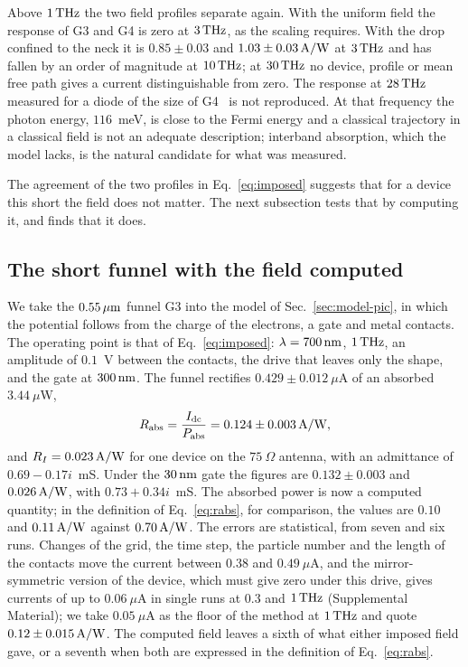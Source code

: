 Above $1\,\mathrm{THz}$ the two field profiles separate again. With the uniform field
the response of G3 and G4 is zero at $3\,\mathrm{THz}$, as the scaling requires. With
the drop confined to the neck it is $0.85\pm0.03$ and $1.03\pm0.03\,\mathrm{A/W}$ at
$3\,\mathrm{THz}$ and has fallen by an order of magnitude at $10\,\mathrm{THz}$; at $30\,\mathrm{THz}$ no device, profile or mean free path gives
a current distinguishable from zero. The response at $28\,\mathrm{THz}$ measured
for a diode of the size of G4~\cite{zhu2013graphene} is not reproduced. At
that frequency the photon energy, $116$~meV, is close to the Fermi energy
and a classical trajectory in a classical field is not an adequate
description; interband absorption, which the model lacks, is the natural
candidate for what was measured.

The agreement of the two profiles in Eq.~\eqref{eq:imposed} suggests that
for a device this short the field does not matter. The next subsection
tests that by computing it, and finds that it does.

\subsection{The short funnel with the field computed}
\label{sec:pic}

We take the $0.55\,\mu\mathrm{m}$ funnel G3 into the model of
Sec.~\ref{sec:model-pic}, in which the potential follows from the charge
of the electrons, a gate and metal contacts. The operating point is that
of Eq.~\eqref{eq:imposed}: $\lambda=700\,\mathrm{nm}$, $1\,\mathrm{THz}$, an amplitude of
$0.1$~V between the contacts, the drive that leaves only the shape, and
the gate at $300\,\mathrm{nm}$. The funnel rectifies $0.429\pm0.012\ \mu$A of an
absorbed $3.44\ \mu$W,
\begin{equation}
R_{\mathrm{abs}}=\frac{I_{\mathrm{dc}}}{P_{\mathrm{abs}}}=0.124\pm0.003\,\mathrm{A/W} ,
\label{eq:computed}
\end{equation}
and $R_{I}=0.023\,\mathrm{A/W}$ for one device on the $75\ \Omega$ antenna, with an
admittance of $0.69-0.17i$~mS. Under the $30\,\mathrm{nm}$ gate the figures are
$0.132\pm0.003$ and $0.026\,\mathrm{A/W}$, with $0.73+0.34i$~mS. The absorbed power
is now a computed quantity; in the definition of Eq.~\eqref{eq:rabs}, for
comparison, the values are $0.10$ and $0.11\,\mathrm{A/W}$ against $0.70\,\mathrm{A/W}$. The
errors are statistical, from seven and six runs. Changes of the grid, the
time step, the particle number and the length of the contacts move the
current between $0.38$ and $0.49\ \mu$A, and the mirror-symmetric version
of the device, which must give zero under this drive, gives currents of up
to $0.06\ \mu$A in single runs at $0.3$ and $1\,\mathrm{THz}$ (Supplemental
Material); we take
$0.05\ \mu$A as the floor of the method at $1\,\mathrm{THz}$ and quote
$0.12\pm0.015\,\mathrm{A/W}$. The computed field leaves a sixth of
what either imposed field gave, or a seventh when both are expressed in
the definition of Eq.~\eqref{eq:rabs}.

